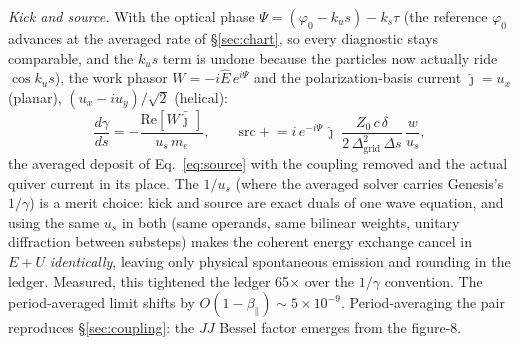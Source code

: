 \documentclass[11pt]{article}
\begin{document}
\emph{Kick and source.} With the optical phase $\Psi = (\varphi_0 - k_u s) - k_s\tau$
(the reference $\varphi_0$ advances at the averaged rate of \S\ref{sec:chart}, so
every diagnostic stays comparable, and the $k_u s$ term is undone because the particles
now actually ride $\cos k_u s$), the work phasor $W = -i\hat E\, e^{i\Psi}$ and the
polarization-basis current $\hat\jmath = u_x$ (planar), $(u_x - iu_y)/\sqrt2$
(helical):
\begin{equation}\label{eq:unavgkick}
  \frac{d\gamma}{ds} = -\frac{\mathrm{Re}[W \bar{\hat\jmath}\,]}{u_s\, m_e},
  \qquad
  \mathrm{src} \mathrel{+}= i\,e^{-i\Psi}\,\hat\jmath\;
     \frac{Z_0\, c\,\delta}{2\,\Delta_{\mathrm{grid}}^2\,\Delta s}\,\frac{w}{u_s},
\end{equation}
the averaged deposit of Eq.~\ref{eq:source} with the coupling removed and the actual
quiver current in its place. The $1/u_s$ (where the averaged solver carries
Genesis's $1/\gamma$) is a merit choice: kick and source are exact duals of one
wave equation, and using the same $u_s$ in both (same operands, same bilinear
weights, unitary diffraction between substeps) makes the coherent energy exchange
cancel in $E+U$ \emph{identically}, leaving only physical spontaneous emission and
rounding in the ledger. Measured, this tightened the ledger 65$\times$ over the
$1/\gamma$ convention. The period-averaged limit shifts by
$O(1-\beta_\parallel) \sim 5\times10^{-9}$. Period-averaging the pair reproduces
\S\ref{sec:coupling}: the $JJ$ Bessel factor emerges from the figure-8.
\end{document}
